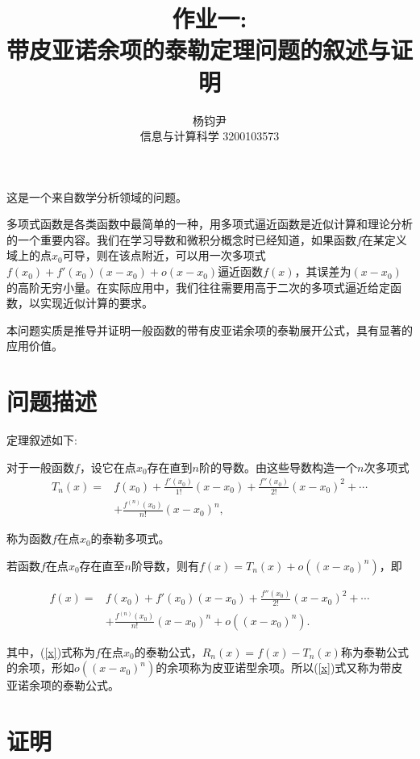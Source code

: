 \documentclass{ctexart}
\title{作业一: \\带皮亚诺余项的泰勒定理问题的叙述与证明}
\author{杨钧尹 \\ 信息与计算科学 3200103573}
\begin{document}
\maketitle

这是一个来自数学分析领域的问题。

多项式函数是各类函数中最简单的一种，用多项式逼近函数是近似计算和理论分析的一个重要内容。我们在学习导数和微积分概念时已经知道，如果函数$f$在某定义域上的点$x_0$可导，则在该点附近，可以用一次多项式$f(x_0)+f'(x_0)(x-x_0)+o(x-x_0)$逼近函数$f(x)$，其误差为$(x-x_0)$的高阶无穷小量。在实际应用中，我们往往需要用高于二次的多项式逼近给定函数，以实现近似计算的要求。

本问题实质是推导并证明一般函数的带有皮亚诺余项的泰勒展开公式，具有显著的应用价值。

\section{问题描述}

定理叙述如下: 

对于一般函数$f$，设它在点$x_0$存在直到$n$阶的导数。由这些导数构造一个$n$次多项式
\begin{equation}\label{eq1}
	\begin{aligned}
		T_n(x)=&f(x_0)+\displaystyle\frac{f'(x_0)}{1!}(x-x_0)+\displaystyle\frac{f''(x_0)}{2!}(x-x_0)^2+\cdots \\
		& +\displaystyle\frac{f^{(n)}(x_0)}{n!}(x-x_0)^n,
	\end{aligned}
\end{equation}

称为函数$f$在点$x_0$的泰勒多项式。

若函数$f$在点$x_0$存在直至$n$阶导数，则有$f(x)=T_n(x)+o((x-x_0)^n)$，即

\begin{equation}\label{x}
	\begin{aligned}
		f(x)=&f(x_0)+f'(x_0)(x-x_0)+\displaystyle\frac{f''(x_0)}{2!}(x-x_0)^2+\cdots \\
		& +\displaystyle\frac{f^{(n)}(x_0)}{n!}(x-x_0)^n+o((x-x_0)^n).
	\end{aligned}
\end{equation}

其中，(\ref{x})式称为$f$在点$x_0$的泰勒公式，$R_n(x)=f(x)-T_n(x)$称为泰勒公式的余项，形如$o((x-x_0)^n)$的余项称为皮亚诺型余项。所以(\ref{x})式又称为带皮亚诺余项的泰勒公式。

\section{证明}
\end{document}
